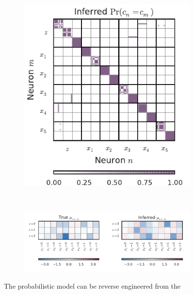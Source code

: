 \begin{figure}[t!]
\begin{subfigure}[b]{2.75in}
   \centering
   \caption{}
   \vspace{-.3in}
   \includegraphics[width=\textwidth]{figures/ch7/mixture_cocluster_probability}
   \label{fig:mixture_cocluster}
 \end{subfigure} \\
 \begin{subfigure}[b]{5.5in}
   \centering
   \caption{}
   \vspace{-.4in}
   \includegraphics[width=\textwidth]{figures/ch7/mixture_prob_weights}
   \label{fig:mixture_prob_weights}
 \end{subfigure}
 \vspace{-.3in}
 \caption[Reverse engineering probabilistic models from neural spike
   trains] {The probabilistic model can be reverse engineered from the
}
\end{figure}
